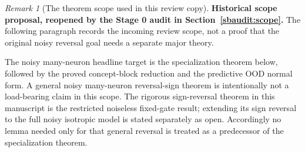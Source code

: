 \documentclass{article} %
\theoremstyle{plain}
\theoremstyle{definition}
\theoremstyle{remark}
\newtheorem{remark}[theorem]{Remark}
\begin{document}
\begin{remark}[The theorem scope used in this review copy]
\label{rem:scope-A-specialization}
\textbf{Historical scope proposal, reopened by the Stage 0 audit in Section~\ref{sbaudit:scope}.} The following paragraph records the incoming review scope, not a proof that the original noisy reversal goal needs a separate major theory.

The noisy many-neuron headline target is the specialization theorem below,
followed by the proved concept-block reduction and the predictive OOD normal
form.  A general noisy many-neuron reversal-sign theorem is intentionally not
a load-bearing claim in this scope.  The rigorous sign-reversal theorem in
this manuscript is the restricted noiseless fixed-gate result; extending its
sign reversal to the full noisy isotropic model is stated separately as open.
Accordingly no lemma needed only for that general reversal is treated as a
predecessor of the specialization theorem.
\end{remark}
\end{document}
